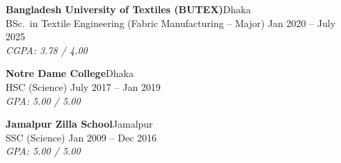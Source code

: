 

\textbf{Bangladesh University of Textiles (BUTEX)}\hfill Dhaka\\
\vspace{1mm}
BSc.\ in Textile Engineering (Fabric Manufacturing – Major) \hfill Jan 2020 – July 2025\\
\vspace{1mm}
\textit{CGPA\@: 3.78 / 4.00}
\vspace{3mm}

\textbf{Notre Dame College}\hfill Dhaka\\
\vspace{1mm}
HSC (Science) \hfill July 2017 – Jan 2019\\
\vspace{1mm}
\textit{GPA\@: 5.00 / 5.00}
\vspace{3mm}

\textbf{Jamalpur Zilla School}\hfill Jamalpur\\
\vspace{1mm}
SSC (Science) \hfill Jan 2009 – Dec 2016\\
\vspace{1mm}
\textit{GPA\@: 5.00 / 5.00}
